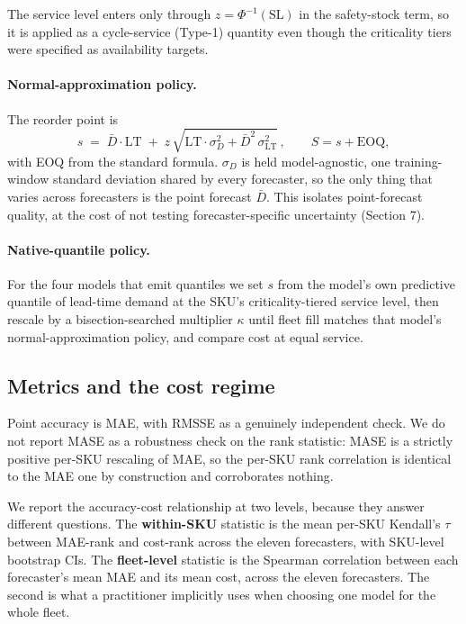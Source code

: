 \documentclass[11pt]{article}
\begin{document}
The service level enters only through $z = \Phi^{-1}(\mathrm{SL})$ in the
safety-stock term, so it is applied as a cycle-service (Type-1) quantity even
though the criticality tiers were specified as availability targets.

\paragraph{Normal-approximation policy.} The reorder point is
\begin{equation*}
s \;=\; \bar{D}\cdot \mathrm{LT}
\;+\; z\,\sqrt{\mathrm{LT}\cdot \sigma_{D}^{2} + \bar{D}^{2}\,\sigma_{\mathrm{LT}}^{2}}\,,
\qquad S = s + \mathrm{EOQ},
\end{equation*}
with EOQ from the standard formula. $\sigma_{D}$ is held model-agnostic, one
training-window standard deviation shared by every forecaster, so the only
thing that varies across forecasters is the point forecast $\bar{D}$. This
isolates point-forecast quality, at the cost of not testing
forecaster-specific uncertainty (Section 7).

\paragraph{Native-quantile policy.} For the four models that emit quantiles we
set $s$ from the model's own predictive quantile of lead-time demand at the
SKU's criticality-tiered service level, then rescale by a bisection-searched
multiplier $\kappa$ until fleet fill matches that model's normal-approximation
policy, and compare cost at equal service.

\subsection{Metrics and the cost regime}

Point accuracy is MAE, with RMSSE as a genuinely independent check. We do not
report MASE as a robustness check on the rank statistic: MASE is a strictly
positive per-SKU rescaling of MAE, so the per-SKU rank correlation is identical
to the MAE one by construction and corroborates nothing.

We report the accuracy-cost relationship at two levels, because they answer
different questions. The \textbf{within-SKU} statistic is the mean per-SKU
Kendall's $\tau$ between MAE-rank and cost-rank across the eleven forecasters,
with SKU-level bootstrap CIs. The \textbf{fleet-level} statistic is the
Spearman correlation between each forecaster's mean MAE and its mean cost,
across the eleven forecasters. The second is what a practitioner implicitly
uses when choosing one model for the whole fleet.
\end{document}
